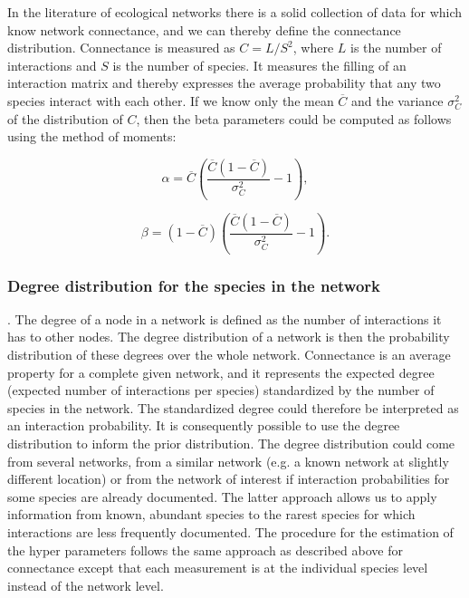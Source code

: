 \documentclass[12pt]{article}
\begin{document}
      In the literature of ecological networks there is a solid collection of data for which know network connectance, and we can thereby define the connectance distribution. Connectance is measured as $C = L/S^2$, where $L$ is the number of interactions and $S$ is the number of species. It measures the filling of an interaction matrix and thereby expresses the average probability that any two species interact with each other. If we know only the mean $\overline{C}$ and the variance $\sigma_C^2$ of the distribution of $C$, then the beta parameters could be computed as follows using the method of moments:

  \begin{equation}
    \alpha = \overline{C}(\frac{\overline{C}(1-\overline{C})}{\sigma_C^2}-1) ,
  \end{equation}

  \begin{equation}
    \beta = (1-\overline{C})(\frac{\overline{C}(1-\overline{C})}{\sigma_C^2}-1) .
  \end{equation}
  
%  
%
%
%


  \subsubsection*{Degree distribution for the species in the network}.
%
The degree of a node in a network is defined as the number of interactions it has to other nodes. The degree distribution of a network is then the probability distribution of these degrees over the whole network. Connectance is an average property for a complete given network, and it represents the expected
degree (expected number of interactions per species) standardized by the number of species in the network. The standardized degree could therefore be interpreted as an interaction probability. It is consequently possible to
use the degree distribution to inform the prior distribution. The degree distribution could
come from several networks, from a similar network (e.g. a known network at slightly different location) or from the network of interest if interaction probabilities for some species are already documented. The latter approach allows us to apply information from known, abundant species to the rarest species for which interactions are less
frequently documented. The procedure for the estimation of the hyper parameters follows
the same approach as described above for connectance except that each
measurement is at the individual species level instead of the network level.
\end{document}
